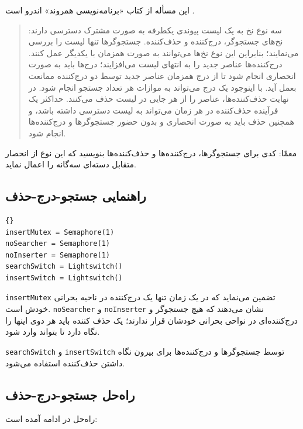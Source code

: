 \documentclass{book}
\newcommand{\clearemptydoublepage}{}%
\begin{document}
    این مسأله از کتاب «برنامه‌نویسی همروند» اندرو است \cite{andrews}.

\begin {quotation}
    سه نوع نخ به یک لیست پیوندی یکطرفه به صورت مشترک دسترسی دارند: 
    نخ‌های جستجوگر، درج‌کننده و حذف‌کننده.  جستجوگرها تنها لیست را بررسی می‌نمایند؛ بنابراین این نوع نخ‌ها می‌توانند به صورت همزمان با یکدیگر 
    عمل کنند. درج‌کننده‌ها عناصر جدید را به انتهای لیست می‌افزایند؛ درج‌ها باید به صورت انحصاری انجام شود تا  از درج همزمان عناصر جدید توسط 
    دو درج‌کننده‌ ممانعت بعمل آید. با اینوجود یک درج می‌تواند به موازات هر تعداد جستجو انجام شود. 
    در نهایت حذف‌کننده‌ها، عناصر را از هر جایی در لیست حذف می‌کنند. 
    حداکثر یک فرآینده حذف‌کننده در  هر زمان می‌تواند به لیست دسترسی داشته باشد، و همچنین حذف باید به صورت انحصاری 
    و بدون حضور جستجوگرها و درج‌کننده‌ها انجام شود. 
\end{quotation}

    معمّا: کدی برای جستجوگرها، درج‌کننده‌ها و حذف‌کننده‌ها بنویسید که این نوع از انحصار متقابل دسته‌ای سه‌گانه را اعمال نماید. 


\clearemptydoublepage
\subsection{راهنمایی جستجو-درج-حذف}

\begin{latin}
\begin{lstlisting}[title=\rl{راهنمایی جستجو-درج-حذف}]{}
insertMutex = Semaphore(1)
noSearcher = Semaphore(1)
noInserter = Semaphore(1)
searchSwitch = Lightswitch()    
insertSwitch = Lightswitch()
\end{lstlisting}
\end{latin}

    {\tt insertMutex}
     تضمین می‌نماید که در یک زمان تنها یک درج‌کننده‌ در ناحیه بحرانی خودش است. 
      {\tt noSearcher} و {\tt noInserter} 
    نشان می‌دهند که هیچ جستجوگر و درج‌کننده‌‌ای در نواحی بحرانی خودشان قرار ندارند؛ یک حذف کننده باید هر دوی 
    اینها را نگاه دارد تا بتواند وارد شود. 

{\tt searchSwitch} و {\tt insertSwitch} 
 توسط جستجوگرها و درج‌کننده‌ها برای بیرون نگاه داشتن حذف‌کننده استفاده می‌شود. 


\clearemptydoublepage
\subsection{راه‌حل جستجو-درج-حذف}

    راه‌حل در ادامه آمده است: 
\end{document}
